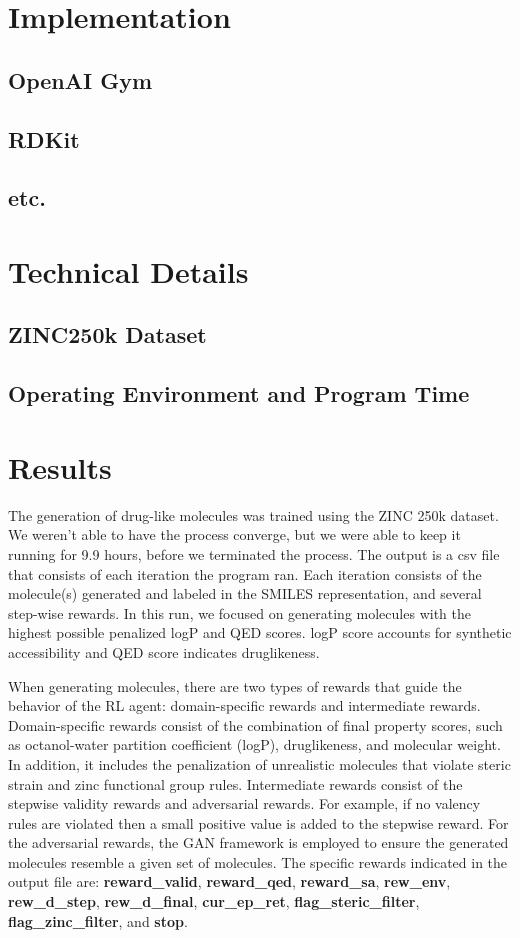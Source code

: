 \documentclass{article}
\begin{document}
\section{Implementation}
\subsection{OpenAI Gym}
\subsection{RDKit}
\subsection{etc.}
\section{Technical Details}
\subsection{ZINC250k Dataset}
\subsection{Operating Environment and Program Time}

\section{Results}
The generation of drug-like molecules was trained using the ZINC 250k dataset. We weren’t able to have the process converge, but we were able to keep it running for 9.9 hours, before we terminated the process. The output is a csv file that consists of each iteration the program ran. Each iteration consists of the molecule(s) generated and labeled in the SMILES representation, and several step-wise rewards. In this run, we focused on generating molecules with the highest possible penalized logP and QED scores. logP score accounts for synthetic accessibility and QED score indicates druglikeness.

When generating molecules, there are two types of rewards that guide the behavior of the RL agent: domain-specific rewards and intermediate rewards. Domain-specific rewards consist of the combination of final property scores, such as octanol-water partition coefficient (logP), druglikeness, and molecular weight. In addition, it includes the penalization of unrealistic molecules that violate steric strain and zinc functional group rules. Intermediate rewards consist of the stepwise validity rewards and adversarial rewards. For example, if no valency rules are violated then a small positive value is added to the stepwise reward. For the adversarial rewards, the GAN framework is employed to ensure the generated molecules resemble a given set of molecules. The specific rewards indicated in the output file are: \textbf{reward_valid}, \textbf{reward_qed}, \textbf{reward_sa}, \textbf{rew_env}, \textbf{rew_d_step}, \textbf{rew_d_final}, \textbf{cur_ep_ret}, \textbf{flag_steric_filter}, \textbf{flag_zinc_filter}, and \textbf{stop}.
\end{document}
